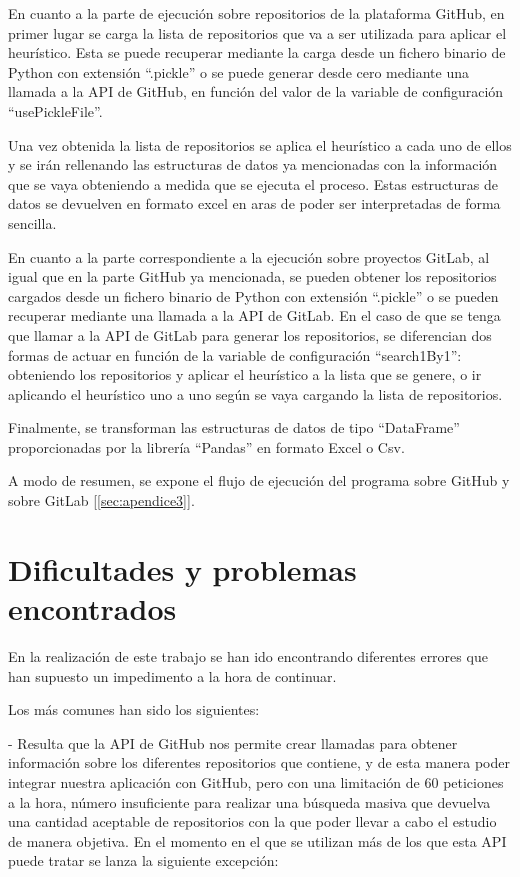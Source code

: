 En cuanto a la parte de ejecución sobre repositorios de la plataforma GitHub, en primer lugar se carga la lista de repositorios que va a ser utilizada para aplicar el heurístico. Esta se puede recuperar mediante la carga desde un fichero binario de Python con extensión ``.pickle'' o se puede generar desde cero mediante una llamada a la API de GitHub, en función del valor de la variable de configuración ``usePickleFile''.

Una vez obtenida la lista de repositorios se aplica el heurístico a cada uno de ellos y se irán rellenando las estructuras de datos ya mencionadas con la información que se vaya obteniendo a medida que se ejecuta el proceso. Estas estructuras de datos se devuelven en formato excel en aras de poder ser interpretadas de forma sencilla.

En cuanto a la parte correspondiente a la ejecución sobre proyectos GitLab, al igual que en la parte GitHub ya mencionada, se pueden obtener los repositorios cargados desde un fichero binario de Python con extensión ``.pickle'' o se pueden recuperar mediante una llamada a la API de GitLab. En el caso de que se tenga que llamar a la API de GitLab para generar los repositorios, se diferencian dos formas de actuar en función de la variable de configuración ``search1By1'': obteniendo los repositorios y aplicar el heurístico a la lista que se genere, o ir aplicando el heurístico uno a uno según se vaya cargando la lista de repositorios.

Finalmente, se transforman las estructuras de datos de tipo ``DataFrame'' proporcionadas por la librería ``Pandas'' en formato Excel o Csv.

A modo de resumen, se expone el flujo de ejecución del programa  sobre GitHub y sobre GitLab [\ref{sec:apendice3}].

\section{Dificultades y problemas encontrados}
En la realización de este trabajo se han ido encontrando diferentes errores que han supuesto un impedimento a la hora de continuar. 

Los más comunes han sido los siguientes:

- Resulta que la API de GitHub nos permite crear llamadas para obtener información sobre los diferentes repositorios que contiene, y de esta manera poder integrar nuestra aplicación con GitHub, pero con una limitación de 60 peticiones a la hora, número insuficiente para realizar una búsqueda masiva que devuelva una cantidad aceptable de repositorios con la que poder llevar a cabo el estudio de manera objetiva. En el momento en el que se utilizan más de los que esta API puede tratar se lanza la siguiente excepción: 

